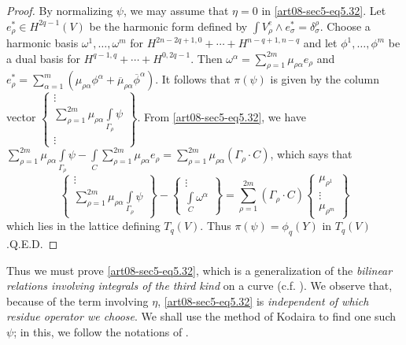 \begin{proof}
By normalizing $\psi$, we may assume that $\eta=0$ in \eqref{art08-sec5-eq5.32}. Let $e^{*}_{\rho}\in H^{2q-1}(V)$ be the harmonic form defined by $\int V^{e}_{\rho}\wedge e^{*}_{\sigma}=\delta^{\rho}_{\sigma}$. Choose a harmonic basis $\omega^{1},\ldots,\omega^{m}$ for $H^{2n-2q+1,0}+\cdots+H^{n-q+1,n-q}$ and let $\phi^{1},\ldots,\phi^{m}$ be a dual basis for $H^{q-1,q}+\cdots+H^{0,2q-1}$. Then $\omega^{\alpha}=\sum\limits^{2m}_{\rho=1}\mu_{\rho\alpha}e_{\rho}$ and $e^{*}_{\rho}=\sum\limits^{m}_{\alpha=1}(\mu_{\rho\alpha}\phi^{\alpha}+\overline{\mu}_{\rho\alpha}\overline{\phi}^{\alpha})$. It follows that $\pi(\psi)$ is given by the column vector $\left\{\begin{smallmatrix} \vdots \\ \sum\limits^{2m}_{\rho=1}\mu_{\rho\alpha}\int\limits_{\Gamma_{\rho}}\psi\\ \vdots\end{smallmatrix}\right\}$. From \eqref{art08-sec5-eq5.32}, we have $\sum\limits^{2m}_{\rho=1}\mu_{\rho\alpha}\int\limits_{\Gamma_{\rho}}\psi-\int\limits_{C}\sum\limits^{2m}_{\rho=1}\mu_{\rho\alpha}e_{\rho}=\sum\limits^{2m}_{\rho=1}\mu_{\rho\alpha}(\Gamma_{\rho}\cdot C)$, which says that
$$
\left\{\begin{matrix}
\vdots\\
\sum\limits^{2m}_{\rho=1}\mu_{\rho\alpha}\int\limits_{\Gamma_{\rho}}\psi
\end{matrix}\right\}
-
\left\{\begin{matrix}
\vdots\\
\int\limits_{C}\omega^{\alpha}
\end{matrix}\right\}
=\sum\limits^{2m}_{\rho=1}(\Gamma_{\rho}\cdot C)
\left\{\begin{matrix}
\mu_{\rho^{1}}\\
\vdots\\
\mu_{\rho^{m}}
\end{matrix}\right\}
$$
which lies in the lattice defining $T_{q}(V)$. Thus $\pi(\psi)=\phi_{q}(Y)$ in $T_{q}(V)$.\hfill Q.E.D.
\end{proof}

Thus we must prove \eqref{art08-sec5-eq5.32}, which is a generalization of the {\em bilinear relations involving integrals of the third kind} on a curve (c.f. \cite{art08-key24}). We observe that, because of the term involving $\eta$, \eqref{art08-sec5-eq5.32} is {\em independent of which residue operator we choose}. We shall use the method of Kodaira \cite{art08-key17} to find one such $\psi$; in this, we follow the notations of \cite{art08-key17}.

